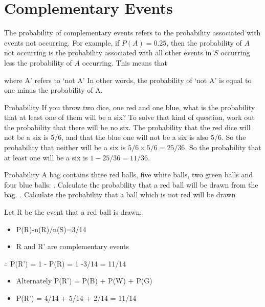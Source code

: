 \documentclass[10pt,a4paper,titlepage,twoside,openright]{report}
\begin{document}
\section{Complementary Events}
The probability of complementary events refers to the probability associated with events not occurring. For example, if $P(A)=0.25$, then the probability of $A$ not occurring is the probability associated with all other events in $S$ occurring less the probability of $A$ occurring. This means that

where A' refers to `not A'
In other words, the probability of `not A' is equal to one minus the probability of A.

\begin{wex}{Probability}
{If you throw two dice, one red and one blue, what is the probability that at least one of them will be a six?}
{
 To solve that kind of question, work out the probability that there will be no six. 
The probability that the red dice will not be a six is 5/6, and that the blue one will not be a six is also 5/6. 
So the probability that neither will be a six is $5/6 \times 5/6 = 25/36$. 
So the probability that at least one will be a six is $1 - 25/36 = 11/36$.
}
\end{wex}

\begin{wex}{Probability}
{A bag contains three red balls, five white balls, two green balls and four blue balls: . Calculate the probability that a red ball will be drawn from the bag. . Calculate the probability that a ball which is not red will be drawn }
{
Let R be the event that a red ball is drawn:
\begin{itemize} 
\item P(R)-n(R)/n(S)=3/14 
\item R and R' are complementary events 
\end{itemize}
$\therefore$ P(R') = 1 - P(R) = 1 -3/14 = 11/14 
\begin{itemize}
\item Alternately P(R') = P(B) + P(W) + P(G) 
\item P(R') = 4/14 + 5/14 + 2/14 = 11/14
\end{itemize} 
}
\end{wex}
\end{document}
